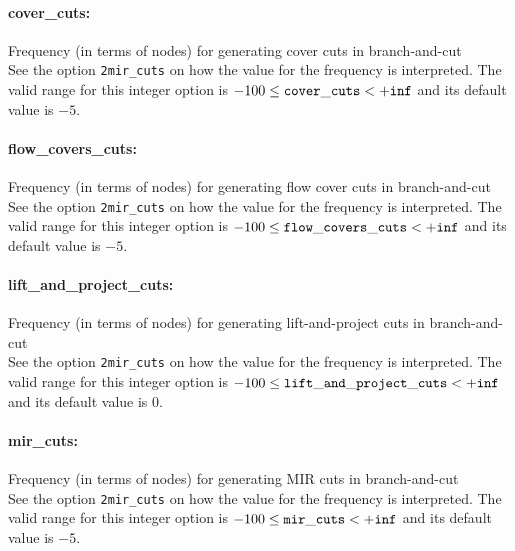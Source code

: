 \paragraph{cover\_cuts:}\label{sec:cover_cuts} Frequency (in terms of nodes) for generating cover cuts in branch-and-cut $\;$ \\
See the option \texttt{2mir\_cuts} on how the value for the frequency is interpreted.
The valid range for this integer option is
$-100 \le {\tt cover\_cuts } <  {\tt +inf}$
and its default value is $-5$.


\paragraph{flow\_covers\_cuts:}\label{sec:flow_covers_cuts} Frequency (in terms of nodes) for generating flow cover cuts in branch-and-cut $\;$ \\
See the option \texttt{2mir\_cuts} on how the value for the frequency is interpreted.
The valid range for this integer option is
$-100 \le {\tt flow\_covers\_cuts } <  {\tt +inf}$
and its default value is $-5$.


\paragraph{lift\_and\_project\_cuts:}\label{sec:lift_and_project_cuts} Frequency (in terms of nodes) for generating lift-and-project cuts in branch-and-cut $\;$ \\
See the option \texttt{2mir\_cuts} on how the value for the frequency is interpreted.
The valid range for this integer option is
$-100 \le {\tt lift\_and\_project\_cuts } <  {\tt +inf}$
and its default value is $0$.


\paragraph{mir\_cuts:}\label{sec:mir_cuts} Frequency (in terms of nodes) for generating MIR cuts in branch-and-cut $\;$ \\
See the option \texttt{2mir\_cuts} on how the value for the frequency is interpreted.
The valid range for this integer option is
$-100 \le {\tt mir\_cuts } <  {\tt +inf}$
and its default value is $-5$.





